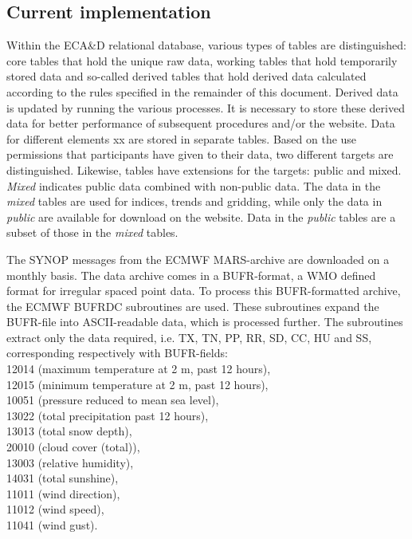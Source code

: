 \documentclass[a4paper,11pt]{article}
\begin{document}
\subsection{Current implementation}
\label{sec:currentimpl}

Within the ECA\&D relational database, various types of tables are
distinguished: core tables that hold the unique raw data, working
tables that hold temporarily stored data and so-called derived tables
that hold derived data calculated according to the rules specified in
the remainder of this document. Derived data is updated by running the
various processes. It is necessary to store these derived data for
better performance of subsequent procedures and/or the website. Data
for different elements xx are stored in separate tables. Based on the
use permissions that participants have given to their data, two
different targets are distinguished. Likewise, tables have extensions
for the targets: public and mixed. \emph{Mixed} indicates public data
combined with non-public data. The data in the \emph{mixed} tables are used
for indices, trends and gridding, while only the data in \emph{public} are
available for download on the website. Data in the \emph{public} tables are a
subset of those in the \emph{mixed} tables.

The SYNOP messages from the ECMWF MARS-archive are downloaded on a
monthly basis. The data archive comes in a BUFR-format, a WMO defined
format for irregular spaced point data. To process this BUFR-formatted
archive, the ECMWF BUFRDC subroutines are used. These subroutines
expand the BUFR-file into ASCII-readable data, which is processed
further. The subroutines extract only the data required, i.e. TX, TN,
PP, RR, SD, CC, HU and SS, corresponding respectively with BUFR-fields:\\
12014 (maximum temperature at 2 m, past 12 hours),\\
12015 (minimum temperature at 2 m, past 12 hours),\\ 
10051 (pressure reduced to mean sea level),\\
13022 (total precipitation past 12 hours),\\
13013 (total snow depth),\\
20010 (cloud cover (total)),\\
13003 (relative humidity),\\
14031 (total sunshine),\\
11011 (wind direction),\\
11012 (wind speed),\\
11041 (wind gust).\\
\end{document}
